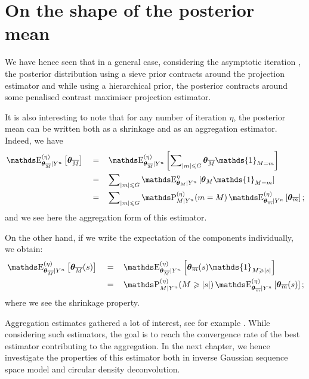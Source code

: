 \section{On the shape of the posterior mean}\label{BAYES_POSTMEAN}

We have hence seen that in a general case, considering the asymptotic iteration , the posterior distribution using a sieve prior contracts around the projection estimator and while using a hierarchical prior, the posterior contracts around some penalised contrast maximiser projection estimator.

It is also interesting to note that for any number of iteration $\eta$, the posterior mean can be written both as a shrinkage and as an aggregation estimator.
Indeed, we have
\begin{alignat*}{3}
& \E_{\boldsymbol{\theta}_{\overline{M}}\vert Y^{n}}^{(\eta)}\left[\boldsymbol{\theta}_{\overline{M}}\right] && = && \E_{\boldsymbol{\theta}_{\overline{M}}\vert Y^{n}}^{(\eta)}\left[\sum\nolimits_{\vert m \vert \leq G} \boldsymbol{\theta}_{\overline{M}} \mathds{1}_{M = m}\right]\\
& && = && \sum\nolimits_{\vert m \vert \leq G} \E_{\boldsymbol{\theta}_{M}\vert Y^{n}}^{\eta}\left[ \boldsymbol{\theta}_{M} \mathds{1}_{M = m}\right]\\
& && = && \sum\nolimits_{\vert m \vert \leq G} \P_{M \vert Y^{n}}^{(\eta)}(m = M) \E_{\boldsymbol{\theta}_{\overline{m}} \vert Y^{n}}^{(\eta)}\left[ \boldsymbol{\theta}_{\overline{m}} \right];
\end{alignat*}
and we see here the aggregation form of this estimator.

On the other hand, if we write the expectation of the components individually, we obtain:
\begin{alignat*}{3}
& \E_{\boldsymbol{\theta}_{\overline{M}}\vert Y^{n}}^{(\eta)}\left[\boldsymbol{\theta}_{\overline{M}}(s)\right] && = && \E_{\boldsymbol{\theta}_{\overline{M}}\vert Y^{n}}^{(\eta)}\left[ \boldsymbol{\theta}_{\overline{m}}(s) \mathds{1}_{M \geq \vert s \vert}\right]\\
& && = && \P_{M \vert Y^{n}}^{(\eta)}(M \geq \vert s \vert) \E_{\boldsymbol{\theta}_{\overline{m}}\vert Y^{n}}^{(\eta)}\left[ \boldsymbol{\theta}_{\overline{m}}(s) \right];
\end{alignat*}
where we see the shrinkage property.

Aggregation estimates gathered a lot of interest, see for example .
While considering such estimators, the goal is to reach the convergence rate of the best estimator contributing to the aggregation.
In the next chapter, we hence investigate the properties of this estimator both in inverse Gaussian sequence space model and circular density deconvolution.
